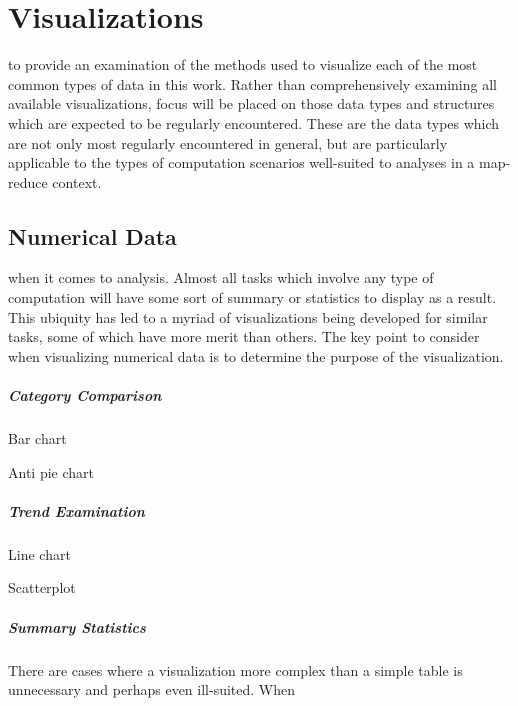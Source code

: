 \chapter{Visualizations}
\label{sec:visualizations}
 to provide an examination of the methods used to visualize each of the most common types of data in this work. Rather than comprehensively examining all available visualizations, focus will be placed on those data types and structures which are expected to be regularly encountered. These are the data types which are not only most regularly encountered in general, but are particularly applicable to the types of computation scenarios well-suited to analyses in a map-reduce context. 
 

\section{Numerical Data}
\label{sec:numerical_data}
 when it comes to analysis. Almost all tasks which involve any type of computation will have some sort of summary  or statistics to display as a result. This ubiquity has led to a myriad of visualizations being developed for similar tasks, some of which have more merit than others. The key point to consider when visualizing numerical data is to determine the purpose of the visualization. 

\paragraph{Category Comparison}
Bar chart

Anti pie chart

\paragraph{Trend Examination} 
Line chart

Scatterplot

\paragraph{Summary Statistics}
There are cases where a visualization more complex than a simple table is unnecessary and perhaps even ill-suited. When 


